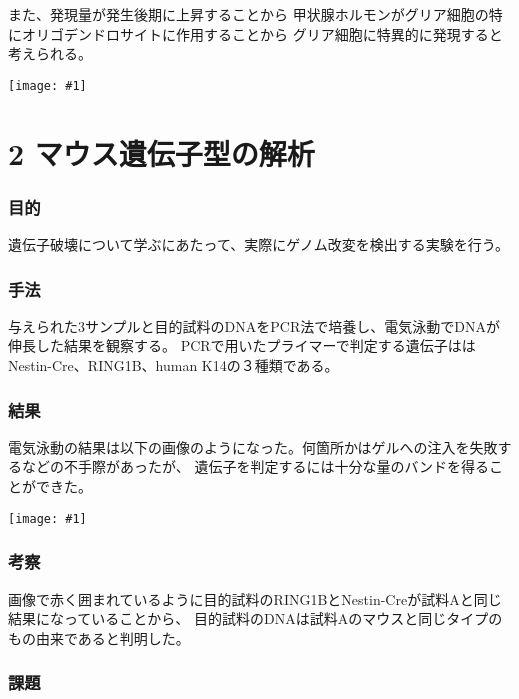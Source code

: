 \documentclass[a4paper,papersize,dvipdfmx]{jsarticle}
\newcommand{\pict}[2]{\begin{center} \texttt{[image: \#1]} \end{center}}   %
\begin{document}
また、発現量が発生後期に上昇することから
甲状腺ホルモンがグリア細胞の特にオリゴデンドロサイトに作用することから
グリア細胞に特異的に発現すると考えられる。

\pict{images/ncbi.png}{6}

\part*{2 マウス遺伝子型の解析}

\section*{目的}
遺伝子破壊について学ぶにあたって、実際にゲノム改変を検出する実験を行う。

\section*{手法}
与えられた3サンプルと目的試料のDNAをPCR法で培養し、電気泳動でDNAが伸長した結果を観察する。
PCRで用いたプライマーで判定する遺伝子ははNestin-Cre、RING1B、human K14の３種類である。

\section*{結果}
電気泳動の結果は以下の画像のようになった。何箇所かはゲルへの注入を失敗するなどの不手際があったが、
遺伝子を判定するには十分な量のバンドを得ることができた。
\pict{images/1024.jpg}{7}


\section*{考察}
画像で赤く囲まれているように目的試料のRING1BとNestin-Creが試料Aと同じ結果になっていることから、
目的試料のDNAは試料Aのマウスと同じタイプのもの由来であると判明した。

\section*{課題}
\end{document}
